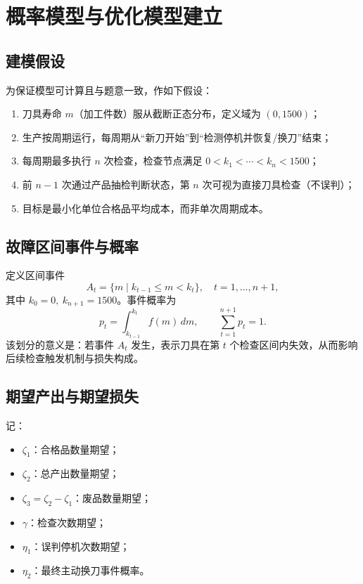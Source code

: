 \chapter{概率模型与优化模型建立}

\section{建模假设}
为保证模型可计算且与题意一致，作如下假设：
\begin{enumerate}
  \item 刀具寿命 $m$（加工件数）服从截断正态分布，定义域为 $(0,1500)$；
  \item 生产按周期运行，每周期从“新刀开始”到“检测停机并恢复/换刀”结束；
  \item 每周期最多执行 $n$ 次检查，检查节点满足 $0<k_1<\cdots<k_n<1500$；
  \item 前 $n-1$ 次通过产品抽检判断状态，第 $n$ 次可视为直接刀具检查（不误判）；
  \item 目标是最小化单位合格品平均成本，而非单次周期成本。
\end{enumerate}

\section{故障区间事件与概率}
定义区间事件
\[
A_t=\{m\mid k_{t-1}\le m<k_t\},\quad t=1,\ldots,n+1,
\]
其中 $k_0=0,\ k_{n+1}=1500$。事件概率为
\begin{equation}
p_t=\int_{k_{t-1}}^{k_t}f(m)\,dm,\qquad \sum_{t=1}^{n+1}p_t=1.
\label{eq:pt}
\end{equation}
该划分的意义是：若事件 $A_t$ 发生，表示刀具在第 $t$ 个检查区间内失效，从而影响后续检查触发机制与损失构成。

\section{期望产出与期望损失}
记：
\begin{itemize}
  \item $\zeta_1$：合格品数量期望；
  \item $\zeta_2$：总产出数量期望；
  \item $\zeta_3=\zeta_2-\zeta_1$：废品数量期望；
  \item $\gamma$：检查次数期望；
  \item $\eta_1$：误判停机次数期望；
  \item $\eta_2$：最终主动换刀事件概率。
\end{itemize}

